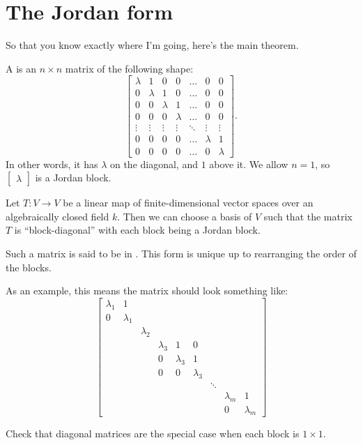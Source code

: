 \section{The Jordan form}
So that you know exactly where I'm going,
here's the main theorem.
\begin{definition}
	A  is an $n \times n$ matrix of the following shape:
	\[
		\begin{bmatrix}
			\lambda & 1 & 0 & 0 & \dots & 0 & 0 \\
			0 & \lambda & 1 & 0 & \dots & 0 & 0 \\
			0 & 0 & \lambda & 1 & \dots & 0 & 0 \\
			0 & 0 & 0 & \lambda & \dots & 0 & 0 \\
			\vdots & \vdots & \vdots & \vdots & \ddots & \vdots & \vdots \\
			0 & 0 & 0 & 0 & \dots & \lambda & 1 \\
			0 & 0 & 0 & 0 & \dots & 0 & \lambda
		\end{bmatrix}.
	\]
	In other words, it has $\lambda$ on the diagonal,
	and $1$ above it.
	We allow $n = 1$,
	so $\begin{bmatrix} \lambda \end{bmatrix}$ is a Jordan block.
\end{definition}

\begin{theorem}
	Let $T \colon V \to V$ be a linear map
	of finite-dimensional vector spaces
	over an algebraically closed field $k$.
	Then we can choose a basis of $V$
	such that the matrix $T$ is ``block-diagonal''
	with each block being a Jordan block.

	Such a matrix is said to be in .
	This form is unique up to rearranging the order of the blocks.
\end{theorem}
As an example, this means the matrix should look something like:
\[
	\begin{bmatrix}
		\lambda_1 & 1 \\
		0 & \lambda_1 \\
		&& \lambda_2 \\
		&&& \lambda_3 & 1 & 0 \\
		&&& 0 & \lambda_3 & 1 \\
		&&& 0 & 0 & \lambda_3 \\
		&&&&&& \ddots \\
		&&&&&&& \lambda_m & 1 \\
		&&&&&&& 0 & \lambda_m
	\end{bmatrix}
\]
\begin{ques}
	Check that diagonal matrices are the special case
	when each block is $1 \times 1$.
\end{ques}

